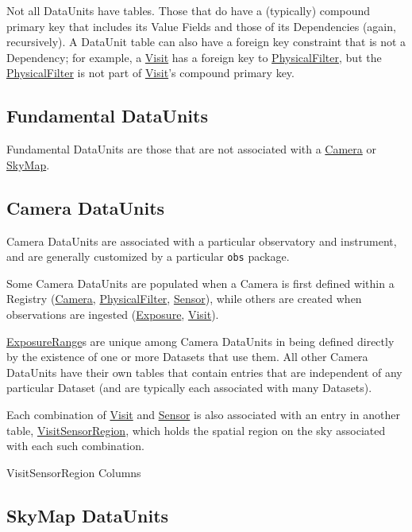 \documentclass[DM,toc]{lsstdoc}
\newcommand{\tblref}[1]{\hyperref[tbl:#1]{#1}}
\newcommand{\unitref}[1]{\hyperref[unit:#1]{#1}}
\newcommand{\coltable}[1]{
    \begin{table}[htb]
        {
            \footnotesize
            
        }
        \caption{#1 Columns}
        \label{tbl:#1}
    \end{table}
}
\newcommand{\unitinc}[1]{}
\begin{document}
Not all DataUnits have tables.
Those that do have a (typically) compound primary key that includes its Value Fields and those of its Dependencies (again, recursively).
A DataUnit table can also have a foreign key constraint that is not a Dependency; for example, a \unitref{Visit} has a foreign key to \unitref{PhysicalFilter}, but the \unitref{PhysicalFilter} is not part of \unitref{Visit}'s compound primary key.

\subsection{Fundamental DataUnits}
\label{sec:fundamental-dataunits}

Fundamental DataUnits are those that are not associated with a \unitref{Camera} or \unitref{SkyMap}.

\unitinc{Label}
\unitinc{AbstractFilter}
\unitinc{SkyPix}

\subsection{Camera DataUnits}
\label{sec:camera-dataunits}

Camera DataUnits are associated with a particular observatory and instrument, and are generally customized by a particular \texttt{obs} package.

Some Camera DataUnits are populated when a Camera is first defined within a Registry (\unitref{Camera}, \unitref{PhysicalFilter}, \unitref{Sensor}), while others are created when observations are ingested (\unitref{Exposure}, \unitref{Visit}).

\unitref{ExposureRange}s are unique among Camera DataUnits in being defined directly by the existence of one or more Datasets that use them.
All other Camera DataUnits have their own tables that contain entries that are independent of any particular Dataset (and are typically each associated with many Datasets).

Each combination of \unitref{Visit} and \unitref{Sensor} is also associated with an entry in another table, \tblref{VisitSensorRegion}, which holds the spatial region on the sky associated with each such combination.

\unitinc{Camera}
\unitinc{PhysicalFilter}
\unitinc{Sensor}
\unitinc{Exposure}
\unitinc{Visit}
\coltable{VisitSensorRegion}
\unitinc{ExposureRange}

\subsection{SkyMap DataUnits}
\label{sec:skymap-dataunits}
\end{document}
